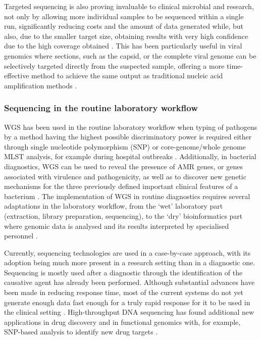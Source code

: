Targeted sequencing is also proving invaluable to clinical microbial and research, not only by allowing more individual samples to be sequenced within a single run, significantly reducing costs and the amount of data generated while, but also, due to the smaller target size, obtaining results with very high confidence due to the high coverage obtained \citep{goodwin_coming_2016}. This has been particularly useful in viral genomics where sections, such as the capsid, or the complete viral genome can be selectively targeted directly from the suspected sample, offering a more time-effective method to achieve the same output as traditional nucleic acid amplification methods \citep{cassedy_virus_2021}. 

\subsubsection{Sequencing in the routine laboratory workflow} \label{sssec:sequencing_routine_lab}

WGS has been used in the routine laboratory workflow when typing of pathogens by a method having the highest possible discriminatory power is required either through single nucleotide polymorphism (SNP) or core-genome/whole genome MLST analysis, for example during hospital outbreaks \citep{tagini_bacterial_2017}. Additionally, in bacterial diagnostics, WGS can be used to reveal the presence of AMR genes, or genes associated with virulence and pathogenicity, as well as to discover new genetic mechanisms for the three previously defined important clinical features of a bacterium \citep{rossen_practical_2018}. The implementation of WGS in routine diagnostics requires several adaptations in the laboratory workflow, from the ‘wet’ laboratory part (extraction, library preparation, sequencing), to the ‘dry’ bioinformatics part where genomic data is analysed and its results interpreted by specialised personnel \citep{rossen_practical_2018}. 

Currently, sequencing technologies are used in a case-by-case approach, with its adoption being much more present in a research setting than in a diagnostic one. Sequencing is mostly used after a diagnostic through the identification of the causative agent has already been performed. Although substantial advances have been made in reducing response time, most of the current systems do not yet generate enough data fast enough for a truly rapid response for it to be used in the clinical setting \citep{goodwin_coming_2016}. High-throughput DNA sequencing has found additional new applications in drug discovery and in functional genomics with, for example, SNP-based analysis to identify new drug targets \citep{loman_twenty_2015}.

